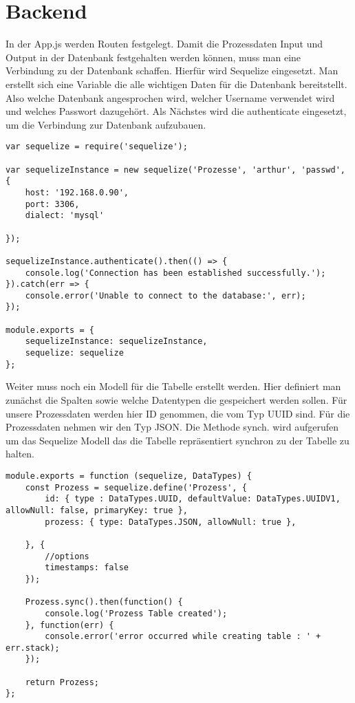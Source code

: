 \documentclass[a4paper,11pt]{scrreprt}
\begin{document}
\section{Backend}
In der App.js werden Routen festgelegt. Damit die Prozessdaten Input und Output in der Datenbank festgehalten werden können, muss man eine Verbindung zu der Datenbank schaffen. Hierfür wird Sequelize eingesetzt. 
Man erstellt sich eine Variable die alle wichtigen Daten für die Datenbank bereitstellt. Also welche Datenbank angesprochen wird, welcher Username verwendet wird und welches Passwort dazugehört. 
Als Nächstes wird die authenticate eingesetzt, um die Verbindung zur Datenbank aufzubauen.
 \begin{lstlisting}
var sequelize = require('sequelize');

var sequelizeInstance = new sequelize('Prozesse', 'arthur', 'passwd', {
    host: '192.168.0.90',
    port: 3306,
    dialect: 'mysql'
    
});

sequelizeInstance.authenticate().then(() => {
    console.log('Connection has been established successfully.');
}).catch(err => {
    console.error('Unable to connect to the database:', err);
});

module.exports = {
    sequelizeInstance: sequelizeInstance,
    sequelize: sequelize
};
\end{lstlisting}
Weiter muss noch ein Modell für die Tabelle erstellt werden. 
Hier definiert man zunächst die Spalten sowie welche Datentypen die  gespeichert werden sollen. Für unsere Prozessdaten werden hier ID genommen, die vom Typ UUID sind. Für die Prozessdaten nehmen wir den Typ JSON. Die Methode synch. wird aufgerufen um das Sequelize Modell das die Tabelle repräsentiert synchron zu der Tabelle zu halten.
 \begin{lstlisting}
module.exports = function (sequelize, DataTypes) {
    const Prozess = sequelize.define('Prozess', {
        id: { type : DataTypes.UUID, defaultValue: DataTypes.UUIDV1,  allowNull: false, primaryKey: true },
        prozess: { type: DataTypes.JSON, allowNull: true },

    }, {
        //options
        timestamps: false
    });

    Prozess.sync().then(function() {
        console.log('Prozess Table created');
    }, function(err) {
        console.error('error occurred while creating table : ' + err.stack);
    });

    return Prozess;
};
\end{lstlisting}
\end{document}
